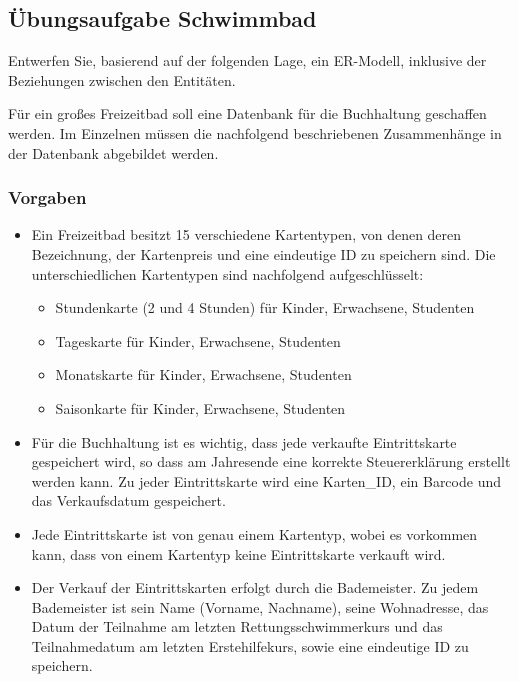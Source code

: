       \subsection{\"Ubungsaufgabe Schwimmbad}
        Entwerfen Sie, basierend auf der folgenden Lage, ein ER-Modell, inklusive der Beziehungen zwischen den Entit\"aten.

        F\"ur ein gro\ss{}es Freizeitbad soll eine Datenbank f\"ur die Buchhaltung geschaffen werden. Im Einzelnen m\"ussen die nachfolgend beschriebenen Zusammenh\"ange in der Datenbank abgebildet werden.

        \subsubsection{Vorgaben}
          \begin{itemize}
            \item Ein Freizeitbad besitzt 15 verschiedene Kartentypen, von denen deren Bezeichnung, der
            Kartenpreis und eine eindeutige ID zu speichern sind. Die unterschiedlichen Kartentypen sind nachfolgend aufgeschl\"usselt:
              \begin{itemize}
                \item Stundenkarte (2 und 4 Stunden) f\"ur Kinder, Erwachsene, Studenten
                \item Tageskarte f\"ur Kinder, Erwachsene, Studenten
                \item Monatskarte f\"ur Kinder, Erwachsene, Studenten
                \item Saisonkarte f\"ur Kinder, Erwachsene, Studenten
              \end{itemize}
            \item F\"ur die Buchhaltung ist es wichtig, dass jede verkaufte Eintrittskarte gespeichert wird, so
            dass am Jahresende eine korrekte Steuererkl\"arung erstellt werden kann. Zu jeder Eintrittskarte wird
            eine Karten\_ID, ein Barcode und das Verkaufsdatum gespeichert.
            \item Jede Eintrittskarte ist von genau einem Kartentyp, wobei es vorkommen kann, dass von einem Kartentyp keine Eintrittskarte verkauft wird.
            \item Der Verkauf der Eintrittskarten erfolgt durch die Bademeister. Zu jedem Bademeister ist
            sein Name (Vorname, Nachname), seine Wohnadresse, das Datum der Teilnahme am letzten Rettungsschwimmerkurs und das Teilnahmedatum am letzten Erstehilfekurs, sowie eine eindeutige ID zu speichern.

\end{itemize}

